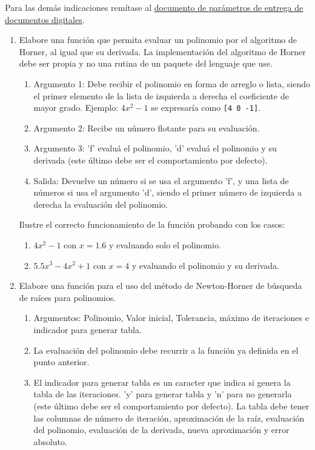 \documentclass[12pt]{article}
\begin{document}
Para las demás indicaciones remítase al \href{https://www.dropbox.com/s/noko8eysm8une33/CondicionesEntrega.pdf?dl=0}{documento de parámetros de entrega de documentos digitales}.%




\vspace{-.5cm}
  \begin{enumerate}[leftmargin=*,widest=9]


    \item Elabore una función que permita evaluar un polinomio por el algoritmo de Horner, al igual que su derivada. La implementación del algoritmo de Horner debe ser propia y no una rutina de un paquete del lenguaje que use.

   \begin{enumerate}[label=\alph*]
    \item Argumento 1: Debe recibir el polinomio en forma de arreglo o lista, siendo el primer elemento de la lista de izquierda a derecha el coeficiente de mayor grado. Ejemplo: \(4x^2-1\) se expresaría como \verb+[4 0 -1]+.
    \item Argumento 2: Recibe un número flotante para su evaluación.
    \item Argumento 3: 'f' evaluá el polinomio, 'd' evaluá el polinomio y su derivada (este último debe ser el comportamiento por defecto).
    \item Salida: Devuelve un número si se usa el argumento 'f', y una lista de números si usa el argumento 'd', siendo el primer número de izquierda a derecha la evaluación del polinomio.
    \end{enumerate}

Ilustre el correcto funcionamiento de la función probando con los casos:
\begin{enumerate}[label=\roman*]
\item  \(4x^2-1\) con \(x=1.6\) y evaluando solo el polinomio.
\item \(5.5x^3 - 4x^2 + 1\) con \(x=4\) y evaluando el polinomio y su derivada.
 \end{enumerate}


    \item Elabore una función para el uso del método de Newton-Horner de búsqueda de raíces para polinomios.

    \begin{enumerate}[label=\alph*]
    \item Argumentos: Polinomio, Valor inicial, Tolerancia, máximo de iteraciones e indicador para generar tabla.
    \item La evaluación del polinomio debe recurrir a la función ya definida en el punto anterior.
	\item El indicador para generar tabla es un caracter que indica si genera la tabla de las iteraciones. 'y' para generar tabla y 'n' para no generarla (este último debe ser el comportamiento por defecto). La tabla debe tener las columnas de número de iteración, aproximación de la raíz, evaluación del polinomio, evaluación de la derivada, nueva aproximación y error absoluto.
\end{enumerate}


\end{enumerate}
\end{document}
